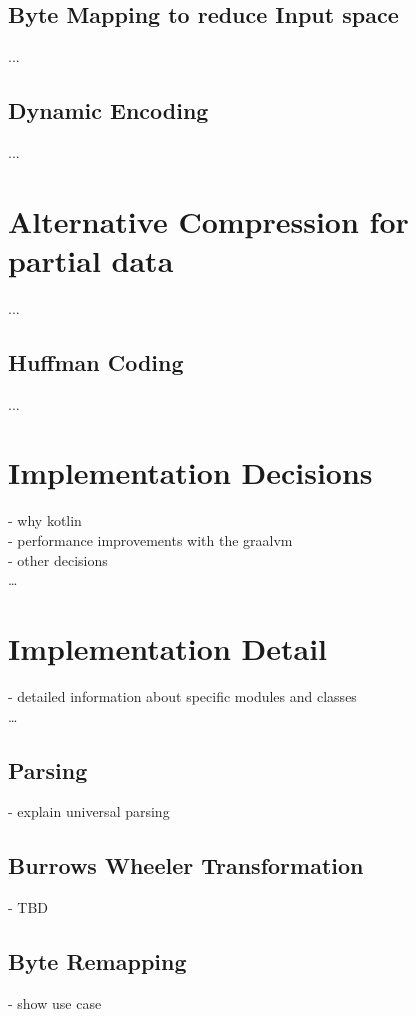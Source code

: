 \subsection{Byte Mapping to reduce Input space}
...
\subsection{Dynamic Encoding}
...

\section{Alternative Compression for partial data}
\label{ch:Conceptual Design:sec:Alternative Encoding}
...
\subsection{Huffman Coding}
...

\section{Implementation Decisions}
\label{ch:Conceptual Design:sec:Implementation Decisions}
- why kotlin\\
- performance improvements with the graalvm\\
- other decisions\\
\ldots

\section{Implementation Detail}
\label{ch:Conceptual Design:sec:Implementation Detail}
- detailed information about specific modules and classes\\
\ldots


\subsection{Parsing}
- explain universal parsing\\
\subsection{Burrows Wheeler Transformation}
- TBD\\
\subsection{Byte Remapping}
- show use case \\
